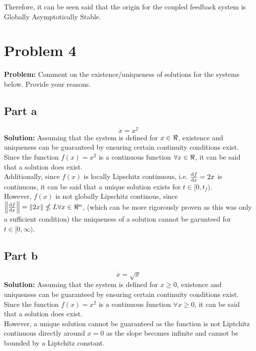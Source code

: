 \documentclass[letter]{article}
\numberwithin{equation}{section}
\begin{document}
Therefore, it can be seen said that the origin for the coupled feedback system is Globally Asymptotically Stable.


\newpage
\section{Problem 4}
\textbf{Problem:}
Comment on the existence/uniqueness of solutions for the systems below. Provide
your reasons.\\

\subsection{Part a}
\begin{equation}
	\dot{x} = x^2
\end{equation}
\noindent
\textbf{Solution:}
Assuming that the system is defined for $x\in \real$, existence and uniqueness can be guaranteed by ensuring certain continuity conditions exist.\\
Since the function $f(x) = x^2$ is a continuous function $\forall x \in \real$, it can be said that a solution does exist.\\
Additionally, since $f(x)$ is locally Lipschitz continuous, i.e. $\dv{f}{x} = 2 x$ is continuous, it can be said that a unique solution exists for $t \in [0,t_f)$.\\
However, $f(x)$ is not globally Lipschitz continous, since $\norm{\dv{f}{x}} = \norm{2x} \nleq L \forall x \in \real^n$, (which can be more rigorously proven as this was only a sufficient condition) the uniqueness of a solution cannot be garunteed for $t \in [0,\infty)$.

\subsection{Part b}
\begin{equation}
	\dot{x} = \sqrt{x}
\end{equation}
\noindent
\textbf{Solution:}
Assuming that the system is defined for $x \geq 0$, existence and uniqueness can be guaranteed by ensuring certain continuity conditions exist.\\
Since the function $f(x) = x^2$ is a continuous function $\forall x \geq 0$, it can be said that a solution does exist.\\
However, a unique solution cannot be guaranteed as the function is not Liptchitz continuous directly around $x=0$ as the slope becomes infinite and cannot be bounded by a Liptchitz constant.
\end{document}
